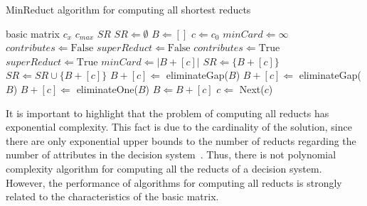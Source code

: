 \documentclass[authoryear,preprint,review,12pt]{elsarticle}
\begin{document}
	\begin{algorithm}
	\footnotesize
	\caption{MinReduct algorithm for computing all shortest reducts}
	\label{alg:MinReduct}
	\begin{algorithmic}[1]
		\Require basic matrix 
		\Statex	 \hspace{1.5em}$c_{x}$ 
		\Statex	 \hspace{1.5em}$c_{max}$ 
		\Ensure $SR$ 
		\State $SR \Leftarrow \emptyset$
		\State $B \Leftarrow []$  
		\State $c \Leftarrow c_0$ 
		\State $minCard \Leftarrow \infty$ 
			\State $contributes \Leftarrow \mathrm{False}$
			\State $superReduct \Leftarrow \mathrm{False}$
		  	\label{line:contrib}
		  		\State $contributes \Leftarrow \mathrm{True}$
		  		\label{line:superReduct}
		  			\State $superReduct \Leftarrow \mathrm{True}$
			  				\State $minCard \Leftarrow |B+ [c]|$
			  				\State $SR \Leftarrow \lbrace B+ [c] \rbrace$
			  			\Else
				  			\State $SR \Leftarrow SR \cup \lbrace B+ [c] \rbrace$
		  				\EndIf
		  		\EndIf
		  	\EndIf
			\label{line:candGen} 
				\label{line:gap}
					\State $B+[c] \Leftarrow $ eliminateGap($B$)
				\Else
					\label{line:reduct}
						\State $B+[c] \Leftarrow $ eliminateGap($B$)
					\Else	
						\State $B+[c] \Leftarrow $ eliminateOne($B$)
					\EndIf
				\EndIf
			\Else
				\label{line:keep}
					\State $B \Leftarrow B+ [c]$
				\EndIf				
				\State $c \Leftarrow$ Next($c$) 
			\EndIf			
	\EndWhile 
		\end{algorithmic}
	\end{algorithm}
	

		
	It is important to highlight that the problem of computing all reducts has exponential complexity. This fact is due to the cardinality of the solution, since there are only exponential upper bounds to the number of reducts regarding the number of attributes in the decision system~\cite{Skowron92}. Thus, there is not  polynomial complexity algorithm for computing all the reducts of a decision system. However, the performance of algorithms for computing all reducts is strongly related to the characteristics of the basic matrix. 
	
\end{document}
